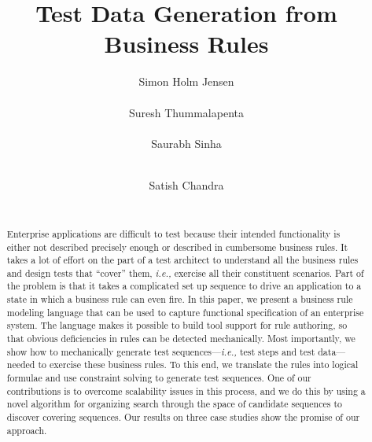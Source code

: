 \documentclass{sig-alternate}
\begin{document}
\newcommand{\ie}{\textit{i.e.,} }
\newcommand{\eg}{\textit{e.g.,} }
\newcommand{\subject}[1]{\texttt{\small #1}}
\newcommand{\rules}{{\mathcal R}}
\newcommand{\tests}{{\mathcal T}}
\newcommand{\elemexists}{\mt{exists}}
\newcommand{\elemenabled}{\mt{enabled}}
\newcommand{\elemexplored}{\mt{explored}}
\newcommand{\note}[1]{{\color{red}$[$ \bf #1 $]$}}
\newcommand{\lang}[1]{\texttt{\scriptsize #1}}
\newcommand{\tool}{\textsc{buster}}
\newcommand{\exhaust}{\textsc{exhaust}}
\newcommand{\choco}{\textsc{choco}}
\newcommand{\wateg}{\textsc{wateg}}

\title{Test Data Generation from Business Rules}
\author{
\alignauthor Simon Holm Jensen \\
\\
\alignauthor Suresh Thummalapenta \\
 \\
\alignauthor Saurabh Sinha \\
 \\
\and 
\alignauthor Satish Chandra \\
 \\
}

\maketitle

\begin{abstract}
Enterprise applications are difficult to test because their intended
functionality is either not described precisely enough or described in
cumbersome business rules. It takes a lot of effort on the part of a test
architect to understand all the business rules and design tests that ``cover''
them, \ie exercise all their constituent scenarios. Part of the problem is that
it takes a complicated set up sequence to drive an application to a state in
which a business rule can even fire.  In this paper, we present a business rule
modeling language that can be used to capture functional specification of an
enterprise system. The language makes it possible to build tool support for rule
authoring, so that obvious deficiencies in rules can be detected
mechanically. Most importantly, we show how to mechanically generate test
sequences---\ie test steps and test data---needed to exercise these business
rules. To this end, we translate the rules into logical formulae and use
constraint solving to generate test sequences.  One of our contributions is to
overcome scalability issues in this process, and we do this by using a novel
algorithm for organizing search through the space of candidate sequences to
discover covering sequences.  Our results on three case studies show the promise
of our approach.
\end{abstract}










\end{document}
